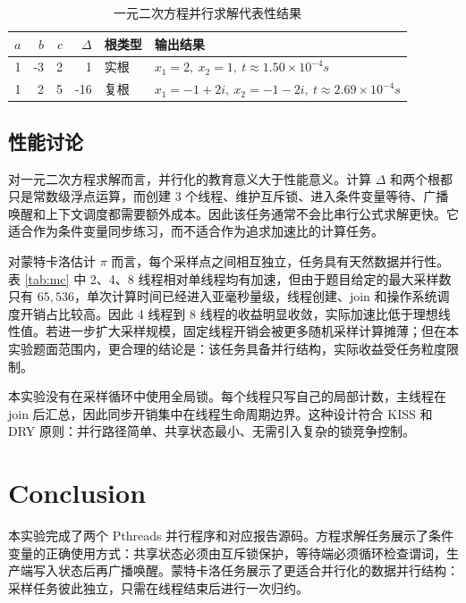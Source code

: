 \documentclass[UTF8,a4paper,12pt,fontset=none]{ctexart}
\begin{document}
\begin{table}[H]
  \centering
  \caption{一元二次方程并行求解代表性结果}
  \label{tab:quadratic}
  \renewcommand{\arraystretch}{1.18}
  \begin{tabularx}{0.92\textwidth}{rrrrlX}
    \toprule
    \(a\) & \(b\) & \(c\) & \(\Delta\) & 根类型 & 输出结果 \\
    \midrule
    1 & -3 & 2 & 1 & 实根 & \(x_1=2,\ x_2=1,\ t\approx 1.50\times 10^{-4}s\) \\
    1 & 2 & 5 & -16 & 复根 & \(x_1=-1+2i,\ x_2=-1-2i,\ t\approx 2.69\times 10^{-4}s\) \\
    \bottomrule
  \end{tabularx}
\end{table}

\subsection{性能讨论}

对一元二次方程求解而言，并行化的教育意义大于性能意义。计算 \(\Delta\) 和两个根都只是常数级浮点运算，而创建 3 个线程、维护互斥锁、进入条件变量等待、广播唤醒和上下文调度都需要额外成本。因此该任务通常不会比串行公式求解更快。它适合作为条件变量同步练习，而不适合作为追求加速比的计算任务。

对蒙特卡洛估计 \(\pi\) 而言，每个采样点之间相互独立，任务具有天然数据并行性。表 \ref{tab:mc} 中 2、4、8 线程相对单线程均有加速，但由于题目给定的最大采样数只有 \(65,536\)，单次计算时间已经进入亚毫秒量级，线程创建、join 和操作系统调度开销占比较高。因此 4 线程到 8 线程的收益明显收敛，实际加速比低于理想线性值。若进一步扩大采样规模，固定线程开销会被更多随机采样计算摊薄；但在本实验题面范围内，更合理的结论是：该任务具备并行结构，实际收益受任务粒度限制。

本实验没有在采样循环中使用全局锁。每个线程只写自己的局部计数，主线程在 join 后汇总，因此同步开销集中在线程生命周期边界。这种设计符合 KISS 和 DRY 原则：并行路径简单、共享状态最小、无需引入复杂的锁竞争控制。

\section{Conclusion}

本实验完成了两个 Pthreads 并行程序和对应报告源码。方程求解任务展示了条件变量的正确使用方式：共享状态必须由互斥锁保护，等待端必须循环检查谓词，生产端写入状态后再广播唤醒。蒙特卡洛任务展示了更适合并行化的数据并行结构：采样任务彼此独立，只需在线程结束后进行一次归约。
\end{document}
